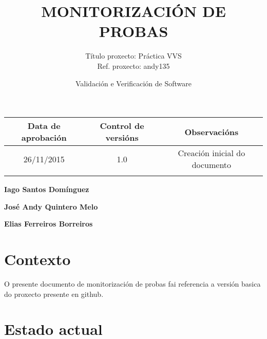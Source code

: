 \documentclass[DIV=calc,paper=a4,fontsize=11pt,onecolumn]{scrartcl}	 %
\title{MONITORIZACIÓN DE PROBAS} %
\author{Título proxecto: Práctica VVS \\
        Ref. proxecto: andy135 }
\date{\sffamily Validación e Verificación de Software} %
\begin{document}
\maketitle %
\thispagestyle{fancy} %


\vspace*{1cm}

\begin{center}
\small \sffamily
  \begin{tabular}{|c|c|c|}
  \hline
  Data de aprobación & Control de versións & Observacións \\ \hline
  26/11/2015& 1.0 & Creación inicial do documento\\ \hline
  & & \\ \hline
  \end{tabular}
\end{center}

\vspace{3cm}

\begin{flushright}
	\large{\textbf{Iago Santos Domínguez}}
			
	\large{\textbf{José Andy Quintero Melo}}
    
    \large{\textbf{Elias Ferreiros Borreiros}}
\end{flushright}

\clearpage


\section{Contexto}

\textnormal{O presente documento de monitorización de probas fai referencia a versión basica do proxecto presente en github.}

\section{Estado actual}
\end{document}

